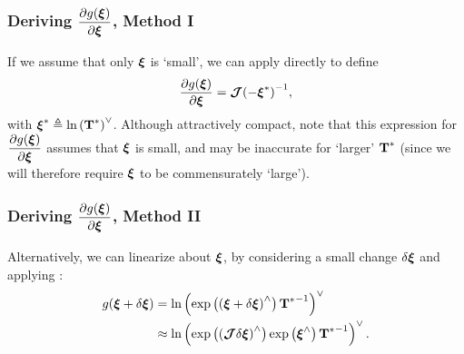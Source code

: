 \subsubsection{Deriving $\dfrac{\partial g({\boldsymbol{\mathbf{\xi}}})}{\partial \boldsymbol{\mathbf{\xi}}}$, Method I}
If we assume that only $\boldsymbol{\mathbf{\xi}}$ is `small', we can apply  directly to define
\begin{equation}
	\label{eq:logjacob_method1}
	\dfrac{\partial g({\boldsymbol{\mathbf{\xi}}})}{\partial \boldsymbol{\mathbf{\xi}}} = {\boldsymbol{\mathbf{\mathcal{J}}}(-\boldsymbol{\mathbf{\xi}}^*)}^{-1}, 
\end{equation}
with $	\boldsymbol{\mathbf{\xi}}^* \triangleq \text{ln}\left({\boldsymbol{\mathbf{T}}^*} \right)^{\vee}$. Although attractively compact, note that this expression for $\dfrac{\partial g({\boldsymbol{\mathbf{\xi}}})}{\partial \boldsymbol{\mathbf{\xi}}}$ assumes that $\boldsymbol{\mathbf{\xi}}$ is small, and may be inaccurate for `larger' $\boldsymbol{\mathbf{T}}^*$ (since we will therefore require $\boldsymbol{\mathbf{\xi}}$ to be commensurately `large').

\subsubsection{Deriving $\dfrac{\partial g({\boldsymbol{\mathbf{\xi}}})}{\partial \boldsymbol{\mathbf{\xi}}}$, Method II}

Alternatively, we can linearize  about $\boldsymbol{\mathbf{\xi}}$, by considering a small change $\delta \boldsymbol{\mathbf{\xi}}$ and applying :
\begin{align}
	g({\boldsymbol{\mathbf{\xi}} + \delta \boldsymbol{\mathbf{\xi}}}) &=  \text{ln}\left({\text{exp}\left({( \boldsymbol{\mathbf{\xi}} + \delta \boldsymbol{\mathbf{\xi}})}^{\wedge}\right) {\boldsymbol{\mathbf{T}}^*}^{-1}} \right)^{\vee} \\
	&\approx \text{ln}\left({\text{exp}\left({(\boldsymbol{\mathbf{\mathcal{J}}} \delta \boldsymbol{\mathbf{\xi}})}^{\wedge}\right) \text{exp}\left({\boldsymbol{\mathbf{\xi}}}^{\wedge}\right) {\boldsymbol{\mathbf{T}}^*}^{-1}} \right)^{\vee}.
\end{align}

